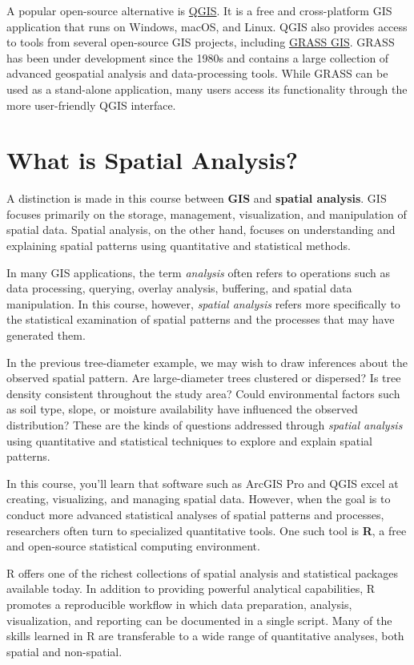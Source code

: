\documentclass[
  letterpaper,
]{book}
\begin{document}
A popular open-source alternative is \href{http://qgis.org}{QGIS}. It is
a free and cross-platform GIS application that runs on Windows, macOS,
and Linux. QGIS also provides access to tools from several open-source
GIS projects, including \href{https://grass.osgeo.org/}{GRASS GIS}.
GRASS has been under development since the 1980s and contains a large
collection of advanced geospatial analysis and data-processing tools.
While GRASS can be used as a stand-alone application, many users access
its functionality through the more user-friendly QGIS interface.

\section{What is Spatial Analysis?}\label{what-is-spatial-analysis}

A distinction is made in this course between \textbf{GIS} and
\textbf{spatial analysis}. GIS focuses primarily on the storage,
management, visualization, and manipulation of spatial data. Spatial
analysis, on the other hand, focuses on understanding and explaining
spatial patterns using quantitative and statistical methods.

In many GIS applications, the term \emph{analysis} often refers to
operations such as data processing, querying, overlay analysis,
buffering, and spatial data manipulation. In this course, however,
\emph{spatial analysis} refers more specifically to the statistical
examination of spatial patterns and the processes that may have
generated them.

In the previous tree-diameter example, we may wish to draw inferences
about the observed spatial pattern. Are large-diameter trees clustered
or dispersed? Is tree density consistent throughout the study area?
Could environmental factors such as soil type, slope, or moisture
availability have influenced the observed distribution? These are the
kinds of questions addressed through \emph{spatial analysis} using
quantitative and statistical techniques to explore and explain spatial
patterns.

In this course, you'll learn that software such as ArcGIS Pro and QGIS
excel at creating, visualizing, and managing spatial data. However, when
the goal is to conduct more advanced statistical analyses of spatial
patterns and processes, researchers often turn to specialized
quantitative tools. One such tool is \textbf{R}, a free and open-source
statistical computing environment.

R offers one of the richest collections of spatial analysis and
statistical packages available today. In addition to providing powerful
analytical capabilities, R promotes a reproducible workflow in which
data preparation, analysis, visualization, and reporting can be
documented in a single script. Many of the skills learned in R are
transferable to a wide range of quantitative analyses, both spatial and
non-spatial.
\end{document}
